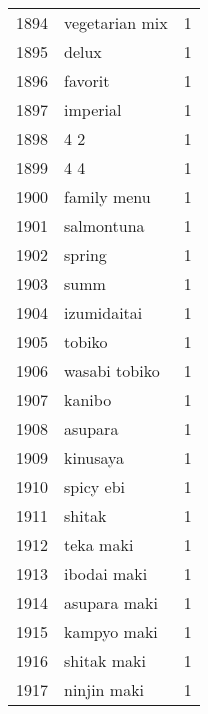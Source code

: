 \begin{tabular}{llr}
1894 &                                     vegetarian mix &      1 \\
1895 &                                              delux &      1 \\
1896 &                                            favorit &      1 \\
1897 &                                           imperial &      1 \\
1898 &                                                4 2 &      1 \\
1899 &                                                4 4 &      1 \\
1900 &                                        family menu &      1 \\
1901 &                                         salmontuna &      1 \\
1902 &                                             spring &      1 \\
1903 &                                               summ &      1 \\
1904 &                                        izumidaitai &      1 \\
1905 &                                             tobiko &      1 \\
1906 &                                      wasabi tobiko &      1 \\
1907 &                                             kanibo &      1 \\
1908 &                                            asupara &      1 \\
1909 &                                           kinusaya &      1 \\
1910 &                                          spicy ebi &      1 \\
1911 &                                             shitak &      1 \\
1912 &                                          teka maki &      1 \\
1913 &                                        ibodai maki &      1 \\
1914 &                                       asupara maki &      1 \\
1915 &                                        kampyo maki &      1 \\
1916 &                                        shitak maki &      1 \\
1917 &                                        ninjin maki &      1 \\

\end{tabular}
